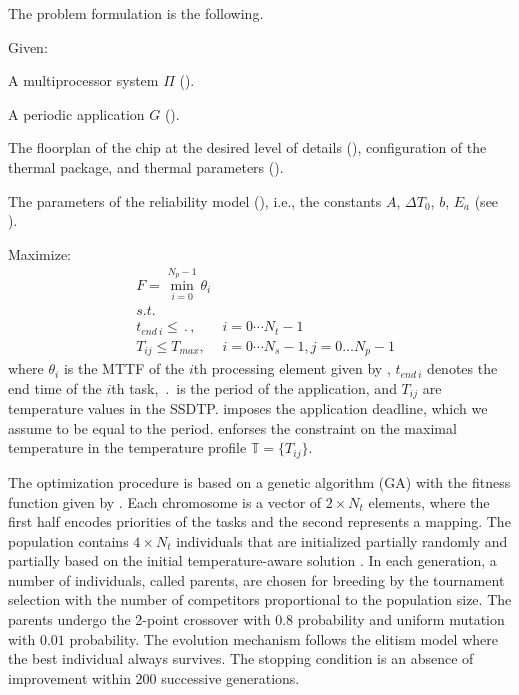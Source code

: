 The problem formulation is the following.

Given:
\begin{ilist}
  \item A multiprocessor system $\Pi$ ().
  \item A periodic application $G$ ().
  \item The floorplan of the chip at the desired level of details (), configuration of the thermal package, and thermal parameters ().
  \item The parameters of the reliability model (), i.e., the constants $A$, $\Delta T_0$, $b$, $E_a$ (see ).
\end{ilist}

Maximize:
\begin{align}
  & F = \min_{i = 0}^{N_p - 1} \theta_i \label{eq:fitness-function} \\
  & s.t. \nonumber \\
  & t_{end \: i} \leq \period, & i = 0 \cdots N_t - 1 \label{eq:deadline} \\
  & T_{ij} \leq T_{max},       & i = 0 \cdots N_s - 1, j = 0 \dots N_p - 1 \label{eq:t-max}
\end{align}
where $\theta_i$ is the MTTF of the $i$th processing element given by , $t_{end \: i}$ denotes the end time of the $i$th task, $\period$ is the period of the application, and $T_{ij}$ are temperature values in the SSDTP.  imposes the application deadline, which we assume to be equal to the period.  enforses the constraint on the maximal temperature in the temperature profile $\mathbb{T} = \{ T_{ij} \}$.

The optimization procedure is based on a genetic algorithm (GA) \cite{schmitz2004} with the fitness function given by . Each chromosome is a vector of $2 \times N_t$ elements, where the first half encodes priorities of the tasks and the second represents a mapping. The population contains $4 \times N_t$ individuals that are initialized partially randomly and partially based on the initial temperature-aware solution \cite{xie2006}. In each generation, a number of individuals, called parents, are chosen for breeding by the tournament selection with the number of competitors proportional to the population size. The parents undergo the 2-point crossover with $0.8$ probability and uniform mutation with $0.01$ probability. The evolution mechanism follows the elitism model where the best individual always survives. The stopping condition is an absence of improvement within $200$ successive generations.

